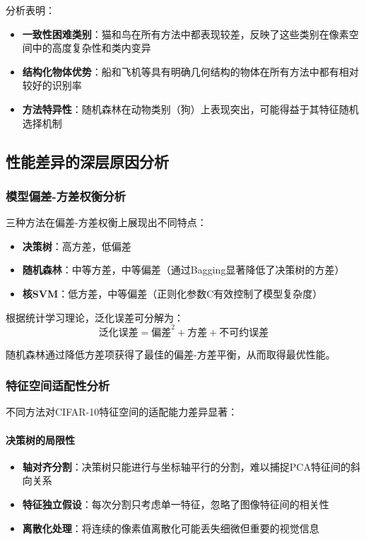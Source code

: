 \documentclass[UTF8]{report}
\theoremstyle{MyLineTheoremStyle} %
\theoremstyle{MyBlockTheoremStyle} %
\theoremstyle{MySubsubsectionStyle} %
\begin{document}
分析表明：
\begin{itemize}
    \item \textbf{一致性困难类别}：猫和鸟在所有方法中都表现较差，反映了这些类别在像素空间中的高度复杂性和类内变异
    \item \textbf{结构化物体优势}：船和飞机等具有明确几何结构的物体在所有方法中都有相对较好的识别率
    \item \textbf{方法特异性}：随机森林在动物类别（狗）上表现突出，可能得益于其特征随机选择机制
\end{itemize}

\subsection{性能差异的深层原因分析}

\subsubsection{模型偏差-方差权衡分析}

三种方法在偏差-方差权衡上展现出不同特点：



\begin{itemize}
    \item \textbf{决策树}：高方差，低偏差
    \item \textbf{随机森林}：中等方差，中等偏差（通过Bagging显著降低了决策树的方差）
    \item \textbf{核SVM}：低方差，中等偏差（正则化参数C有效控制了模型复杂度）
\end{itemize}

根据统计学习理论，泛化误差可分解为：
\begin{equation}
\text{泛化误差} = \text{偏差}^2 + \text{方差} + \text{不可约误差}
\end{equation}

随机森林通过降低方差项获得了最佳的偏差-方差平衡，从而取得最优性能。

\subsubsection{特征空间适配性分析}

不同方法对CIFAR-10特征空间的适配能力差异显著：

\paragraph{决策树的局限性}
\begin{itemize}
    \item \textbf{轴对齐分割}：决策树只能进行与坐标轴平行的分割，难以捕捉PCA特征间的斜向关系
    \item \textbf{特征独立假设}：每次分割只考虑单一特征，忽略了图像特征间的相关性
    \item \textbf{离散化处理}：将连续的像素值离散化可能丢失细微但重要的视觉信息
\end{itemize}
\end{document}
